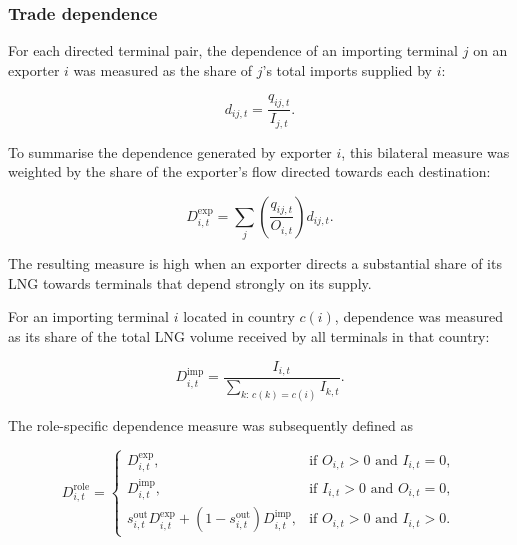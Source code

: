 \documentclass[pdftex,12pt,openright,a4paper,oneside]{book}
\begin{document}
\subsubsection{Trade dependence}

For each directed terminal pair, the dependence of an importing terminal \(j\) on an exporter \(i\) was measured as the share of \(j\)'s total imports supplied by \(i\):

\begin{equation}
d_{ij,t}
=
\frac{q_{ij,t}}{I_{j,t}}.
\label{eq:recipient_dependence}
\end{equation}

To summarise the dependence generated by exporter \(i\), this bilateral measure was weighted by the share of the exporter's flow directed towards each destination:

\begin{equation}
D^{\mathrm{exp}}_{i,t}
=
\sum_j
\left(
\frac{q_{ij,t}}{O_{i,t}}
\right)
d_{ij,t}.
\label{eq:export_dependence}
\end{equation}

The resulting measure is high when an exporter directs a substantial share of its LNG towards terminals that depend strongly on its supply.

For an importing terminal \(i\) located in country \(c(i)\), dependence was measured as its share of the total LNG volume received by all terminals in that country:

\begin{equation}
D^{\mathrm{imp}}_{i,t}
=
\frac{I_{i,t}}
{\displaystyle\sum_{k:\,c(k)=c(i)} I_{k,t}}.
\label{eq:import_dependence}
\end{equation}

The role-specific dependence measure was subsequently defined as

\begin{equation}
D^{\mathrm{role}}_{i,t}
=
\begin{cases}
D^{\mathrm{exp}}_{i,t},
& \text{if } O_{i,t}>0 \text{ and } I_{i,t}=0, \\[4pt]
D^{\mathrm{imp}}_{i,t},
& \text{if } I_{i,t}>0 \text{ and } O_{i,t}=0, \\[4pt]
s^{\mathrm{out}}_{i,t}D^{\mathrm{exp}}_{i,t}
+
\left(1-s^{\mathrm{out}}_{i,t}\right)
D^{\mathrm{imp}}_{i,t},
& \text{if } O_{i,t}>0 \text{ and } I_{i,t}>0.
\end{cases}
\label{eq:role_dependence}
\end{equation}
\end{document}

